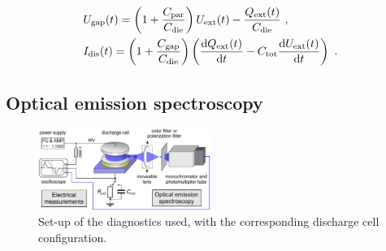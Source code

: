 \documentclass[a4paper,10pt,twoside]{article}
\newcommand{\diff}{\textnormal{d}}
\newcommand{\ix}[1]{_\text{#1}}
\begin{document}
				\begin{align*}
					 &U\ix{gap}(t)=\left(1+\frac{C\ix{par}}{C\ix{die}}\right)U\ix{ext}(t)-\frac{Q\ix{ext}(t)}{C\ix{die}} \,\, , \\
					 &I\ix{dis}(t)=\left(1+\frac{C\ix{gap}}{C\ix{die}}\right)\left(\frac{\diff Q\ix{ext}(t)}{\diff t}-C\ix{tot}\frac{\diff U\ix{ext}(t)}{\diff t}\right) \,\, .
				\end{align*}	

		\subsection{Optical emission spectroscopy}\label{subsec:oes}
		
				\begin{figure}
					\centering
					\hspace{-0.5cm}\includegraphics[width=0.5\textwidth]{figures/setup/setup}
					\caption{Set-up of the diagnostics used, with the corresponding discharge cell configuration.}
					\label{img:diag}
				\end{figure}
		
\end{document}

